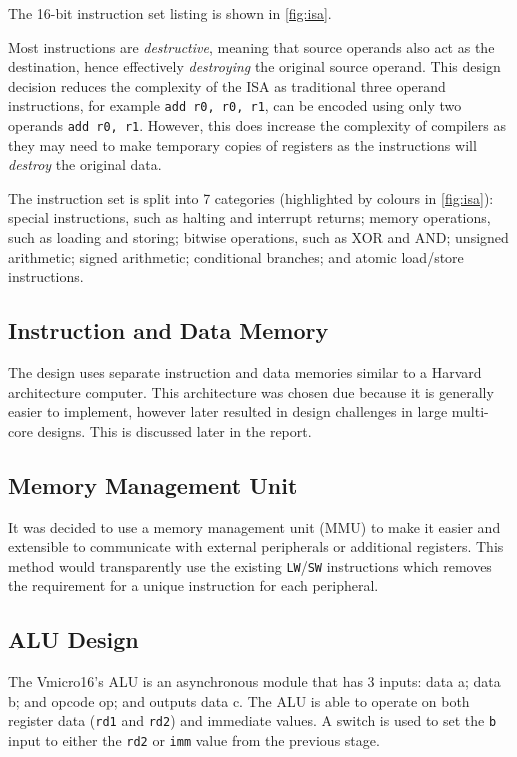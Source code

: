 \noindent
The 16-bit instruction set listing is shown in \cref{fig:isa}.

Most instructions are \textit{destructive}, meaning that source operands also act as the destination, hence effectively \textit{destroying} the original source operand. This design decision reduces the complexity of the ISA as traditional three operand instructions, for example \verb|add r0, r0, r1|, can be encoded using only two operands \verb|add r0, r1|. However, this does increase the complexity of compilers as they may need to make temporary copies of registers as the instructions will \textit{destroy} the original data.

The instruction set is split into 7 categories (highlighted by colours in \cref{fig:isa}): special instructions, such as halting and interrupt returns; memory operations, such as loading and storing; bitwise operations, such as XOR and AND; unsigned arithmetic; signed arithmetic; conditional branches; and atomic load/store instructions.


\subsection{Instruction and Data Memory}
The design uses separate instruction and data memories similar to a Harvard architecture computer. This architecture was chosen due because it is generally easier to implement, however later resulted in design challenges in large multi-core designs. This is discussed later in the report.

\subsection{Memory Management Unit}
It was decided to use a memory management unit (MMU) to make it easier and extensible to communicate with external peripherals or additional registers. This method would transparently use the existing \verb|LW|/\verb|SW| instructions which removes the requirement for a unique instruction for each peripheral. 


\subsection{ALU Design}
The Vmicro16's ALU is an asynchronous module that has 3 inputs: data a; data b; and opcode op; and outputs data c.
The ALU is able to operate on both register data (\verb|rd1| and \verb|rd2|) and immediate values. A switch is used to set the \verb|b| input to either the \verb|rd2| or \verb|imm| value from the previous stage.

